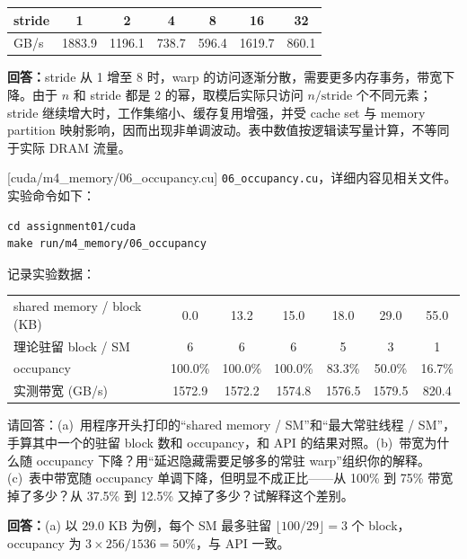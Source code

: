 \documentclass[11pt,a4paper,fontset=windows]{ctexart}
\begin{document}
\begin{center}\small
\begin{tabular}{@{}lcccccc@{}}
\toprule
stride & 1 & 2 & 4 & 8 & 16 & 32 \\
\midrule
GB/s & 1883.9 & 1196.1 & 738.7 & 596.4 & 1619.7 & 860.1 \\
\bottomrule
\end{tabular}
\end{center}

\par\textbf{回答：}stride 从 1 增至 8 时，warp 的访问逐渐分散，需要更多内存事务，带宽下降。由于 $n$ 和 stride 都是 2 的幂，取模后实际只访问 $n/\text{stride}$ 个不同元素；stride 继续增大时，工作集缩小、缓存复用增强，并受 cache set 与 memory partition 映射影响，因而出现非单调波动。表中数值按逻辑读写量计算，不等同于实际 DRAM 流量。

[cuda/m4\_memory/06\_occupancy.cu]
\texttt{06\_occupancy.cu}，详细内容见相关文件。实验命令如下：

\begin{lstlisting}
cd assignment01/cuda
make run/m4_memory/06_occupancy
\end{lstlisting}

记录实验数据：

\begin{center}\small
\begin{tabular}{@{}lcccccc@{}}
\toprule
shared memory / block (KB) & 0.0 & 13.2 & 15.0 & 18.0 & 29.0 & 55.0 \\
理论驻留 block / SM & 6 & 6 & 6 & 5 & 3 & 1 \\
occupancy & 100.0\% & 100.0\% & 100.0\% & 83.3\% & 50.0\% & 16.7\% \\
实测带宽 (GB/s) & 1572.9 & 1572.2 & 1574.8 & 1576.5 & 1579.5 & 820.4 \\
\bottomrule
\end{tabular}
\end{center}

请回答：(a)~用程序开头打印的“shared memory / SM”和“最大常驻线程 / SM”，手算其中一个的驻留 block 数和 occupancy，和 API 的结果对照。(b)~带宽为什么随 occupancy 下降？用“延迟隐藏需要足够多的常驻 warp”组织你的解释。(c)~表中带宽随 occupancy 单调下降，但明显不成正比——从 100\% 到 75\% 带宽掉了多少？从 37.5\% 到 12.5\% 又掉了多少？试解释这个差别。

\par\textbf{回答：}(a) 以 29.0 KB 为例，每个 SM 最多驻留 $\lfloor100/29\rfloor=3$ 个 block，occupancy 为 $3\times256/1536=50\%$，与 API 一致。
\end{document}
